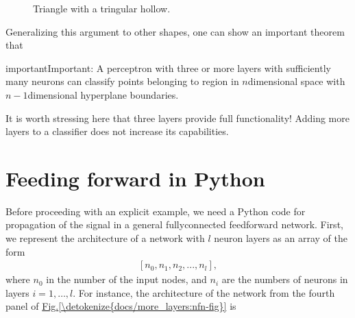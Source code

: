 \documentclass[letterpaper,10pt,english]{jupyterBook}
\let\sphinxpxdimen\pdfpxdimen\else\newdimen\sphinxpxdimen
\begin{document}
\begin{figure}[htbp]
\centering
\capstart

\noindent\sphinxincludegraphics[width=200\sphinxpxdimen]{{tritri}.png}
\caption{Triangle with a tringular hollow.}\label{\detokenize{docs/more_layers:tri-fig}}\end{figure}

\sphinxAtStartPar
Generalizing this argument to other shapes, one can show an important theorem that

\begin{sphinxadmonition}{important}{Important:}
\sphinxAtStartPar
A perceptron with three or more layers with sufficiently many neurons can classify points belonging to  region in \(n\)\sphinxhyphen{}dimensional space with \(n-1\)\sphinxhyphen{}dimensional hyperplane boundaries.
\end{sphinxadmonition}

\sphinxAtStartPar
It is worth stressing here that three layers provide full functionality! Adding more layers to a classifier does not increase its capabilities.


\section{Feeding forward in Python}
\label{\detokenize{docs/more_layers:feeding-forward-in-python}}
\sphinxAtStartPar
Before proceeding with an explicit example, we need a Python code for propagation of the signal in a general fully\sphinxhyphen{}connected feed\sphinxhyphen{}forward network. First, we represent the architecture of a network with \(l\) neuron layers as an array of the form
\begin{equation*}
\begin{split}[n_0,n_1,n_2,...,n_l],\end{split}
\end{equation*}
\sphinxAtStartPar
where \(n_0\) in the number of the input nodes, and \(n_i\) are the numbers of neurons in layers \(i=1,\dots,l\). For instance, the architecture of the network from the fourth panel of \hyperref[\detokenize{docs/more_layers:nfn-fig}]{Fig.\@ \ref{\detokenize{docs/more_layers:nfn-fig}}} is

\begin{sphinxVerbatim}[commandchars=\\\{\}]
\PYG{p}{[}\PYG{p}{]} 
\end{sphinxVerbatim}
\end{document}
